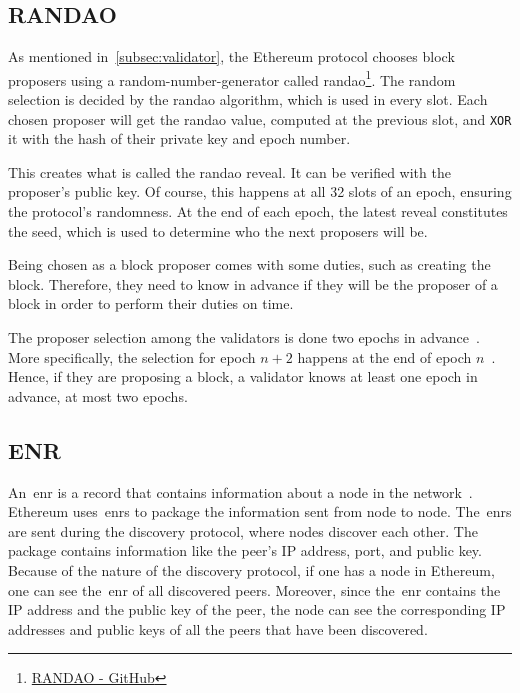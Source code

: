 \subsection{RANDAO}\label{subsec:randao}
As mentioned in~\autoref{subsec:validator}, the Ethereum protocol chooses block proposers using a random-number-generator called \gls{randao}\footnote{\href{https://github.com/randao/randao}{RANDAO - GitHub}}.
The random selection is decided by the \gls{randao} algorithm, which is used in every slot.
Each chosen proposer will get the \gls{randao} value, computed at the previous slot, and \texttt{XOR} it with the hash of their private key and epoch number.


This creates what is called the \gls{randao} reveal.
It can be verified with the proposer's public key.
Of course, this happens at all 32 slots of an epoch, ensuring the protocol's randomness.
At the end of each epoch, the latest reveal constitutes the seed, which is used to determine who the next proposers will be.


Being chosen as a block proposer comes with some duties, such as creating the block.
Therefore, they need to know in advance if they will be the proposer of a block in order to perform their duties on time.

The proposer selection among the validators is done two epochs in advance~\cite{random-selection}.
More specifically, the selection for epoch $n+2$ happens at the end of epoch $n$~\cite{upgrading-ethereum-randomness}.
Hence, if they are proposing a block, a validator knows at least one epoch in advance, at most two epochs.


\subsection{ENR}\label{subsec:enr}
An~\gls{enr} is a record that contains information about a node in the network~\cite{EIP-778:Ethereum-Node-Records}.
Ethereum uses~\glspl{enr} to package the information sent from node to node.
The~\glspl{enr} are sent during the discovery protocol, where nodes discover each other.
The package contains information like the peer's IP address, port, and public key.
Because of the nature of the discovery protocol, if one has a node in Ethereum, one can see the~\gls{enr} of all discovered peers.
Moreover, since the~\gls{enr} contains the IP address and the public key of the peer, the node can see the corresponding IP addresses and public keys of all the peers that have been discovered.


